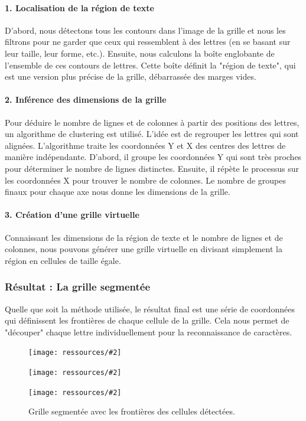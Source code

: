 \documentclass{article}
\newcommand{\stepimage}[3][0.3\textwidth]{%
  \minipage{#1}
    \texttt{[image: ressources/\#2]}
    \caption{#3}
  \endminipage\hfill
}
\begin{document}
\paragraph{1. Localisation de la région de texte}
D'abord, nous détectons tous les contours dans l'image de la grille et nous les filtrons pour ne garder que ceux qui ressemblent à des lettres (en se basant sur leur taille, leur forme, etc.). Ensuite, nous calculons la boîte englobante de l'ensemble de ces contours de lettres. Cette boîte définit la "région de texte", qui est une version plus précise de la grille, débarrassée des marges vides.


\paragraph{2. Inférence des dimensions de la grille}
Pour déduire le nombre de lignes et de colonnes à partir des positions des lettres, un algorithme de clustering est utilisé. L'idée est de regrouper les lettres qui sont alignées. L'algorithme traite les coordonnées Y et X des centres des lettres de manière indépendante. D'abord, il groupe les coordonnées Y qui sont très proches pour déterminer le nombre de lignes distinctes. Ensuite, il répète le processus sur les coordonnées X pour trouver le nombre de colonnes. Le nombre de groupes finaux pour chaque axe nous donne les dimensions de la grille.

\paragraph{3. Création d'une grille virtuelle}
Connaissant les dimensions de la région de texte et le nombre de lignes et de colonnes, nous pouvons générer une grille virtuelle en divisant simplement la région en cellules de taille égale.

\subsubsection{Résultat : La grille segmentée}

Quelle que soit la méthode utilisée, le résultat final est une série de coordonnées qui définissent les frontières de chaque cellule de la grille. Cela nous permet de "découper" chaque lettre individuellement pour la reconnaissance de caractères.

\begin{figure}[H]
    \stepimage[0.30\textwidth]{image_1_step_10_reconstructed_grid.png}{}
    \stepimage[0.30\textwidth]{image_2_step_10_reconstructed_grid.png}{}
    \stepimage[0.26\textwidth]{image_3_step_10_reconstructed_grid.png}{}
    \caption{Grille segmentée avec les frontières des cellules détectées.}
\end{figure}
\end{document}
